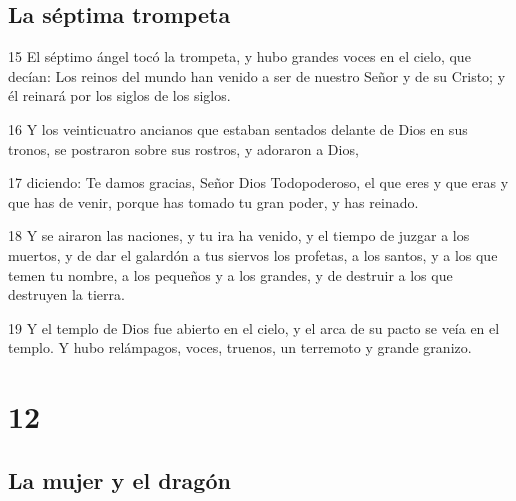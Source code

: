 \section*{La séptima trompeta}

\par 15 El séptimo ángel tocó la trompeta, y hubo grandes voces en el cielo, que decían: Los reinos del mundo han venido a ser de nuestro Señor y de su Cristo; y él reinará por los siglos de los siglos.
\par 16 Y los veinticuatro ancianos que estaban sentados delante de Dios en sus tronos, se postraron sobre sus rostros, y adoraron a Dios,
\par 17 diciendo: Te damos gracias, Señor Dios Todopoderoso, el que eres y que eras y que has de venir, porque has tomado tu gran poder, y has reinado.
\par 18 Y se airaron las naciones, y tu ira ha venido, y el tiempo de juzgar a los muertos, y de dar el galardón a tus siervos los profetas, a los santos, y a los que temen tu nombre, a los pequeños y a los grandes, y de destruir a los que destruyen la tierra.
\par 19 Y el templo de Dios fue abierto en el cielo, y el arca de su pacto se veía en el templo. Y hubo relámpagos, voces, truenos, un terremoto y grande granizo.

\chapter{12}

\section*{La mujer y el dragón}

